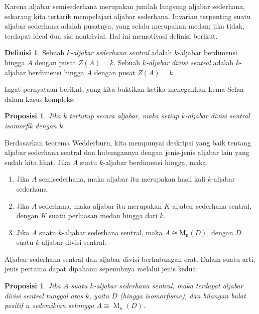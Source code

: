 \documentclass[12pt]{article}
\theoremstyle{plain}
\newtheorem{proposition}[theorem]{Proposisi}
\theoremstyle{definition}
\newtheorem{definition}[theorem]{Definisi}
\theoremstyle{remark}
\numberwithin{equation}{section}
\begin{document}
Karena aljabar semisederhana merupakan jumlah langsung aljabar sederhana,
sekarang kita tertarik mempelajari aljabar sederhana.
Invarian terpenting suatu aljabar sederhana adalah pusatnya,
yang selalu merupakan medan; jika tidak, terdapat ideal dua sisi
nontrivial. Hal ini memotivasi definisi berikut.

\begin{definition}
Sebuah \emph{$k$-aljabar sederhana sentral} adalah $k$-aljabar berdimensi hingga
$A$ dengan pusat $Z(A)=k$.
Sebuah \emph{$k$-aljabar divisi sentral} adalah $k$-aljabar berdimensi hingga
$A$ dengan pusat $Z(A)=k$.
\end{definition}

Ingat pernyataan berikut, yang kita buktikan ketika menegakkan Lema Schur
dalam kasus kompleks:

\begin{proposition} \label{prop:division_ac}
Jika $k$ tertutup secara aljabar, maka setiap $k$-aljabar divisi sentral
isomorfik dengan $k$.
\end{proposition}

Berdasarkan teorema Wedderburn, kita mempunyai deskripsi yang baik tentang aljabar
sederhana sentral dan hubungannya dengan jenis-jenis
aljabar lain yang sudah kita lihat. Jika $A$ suatu $k$-aljabar berdimensi hingga,
maka:

\begin{enumerate}
\item Jika $A$ semisederhana, maka aljabar itu merupakan hasil kali $k$-aljabar sederhana.
\item Jika $A$ sederhana, maka aljabar itu merupakan $K$-aljabar sederhana sentral, dengan
$K$ suatu perluasan medan hingga dari $k$.
\item Jika $A$ suatu $k$-aljabar sederhana sentral, maka $A \cong
\operatorname{M_n}(D)$, dengan $D$ suatu $k$-aljabar divisi sentral.
\end{enumerate}

Aljabar sederhana sentral dan aljabar divisi berhubungan erat.
Dalam suatu arti, jenis pertama dapat dipahami sepenuhnya melalui jenis kedua:

\begin{proposition}
Jika $A$ suatu $k$-aljabar sederhana sentral, maka terdapat aljabar divisi sentral tunggal
atas $k$, yaitu $D$ (hingga isomorfisme), dan bilangan bulat positif $n$
sedemikian sehingga $A \cong \operatorname{M}_n(D)$.
\end{proposition}
\end{document}
